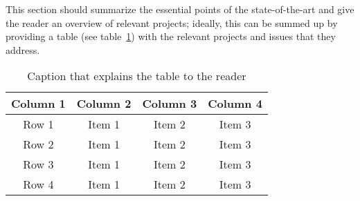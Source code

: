 This section should summarize the essential points of the state-of-the-art and give the reader an overview of relevant projects; ideally, this can be summed up by providing a table (see table~\ref{table:tablelabel}) with the relevant projects and issues that they address.

\begin{table}[!h]
\begin{center}
	\begin{tabular}{|c|c|c|c|} 
	\hline
 	\bf Column 1  & \bf Column 2  & \bf Column 3 & \bf Column 4  \\
  	\hline
	Row 1 & Item 1 & Item 2 & Item 3 \\
	Row 2 & Item 1 & Item 2 & Item 3 \\
	Row 3 & Item 1 & Item 2 & Item 3 \\
	Row 4 & Item 1 & Item 2 & Item 3 \\
	\hline
	\end{tabular}
\end{center}
\caption[ToC Caption]{Caption that explains the table to the reader}	
\label{table:tablelabel}
\end{table}